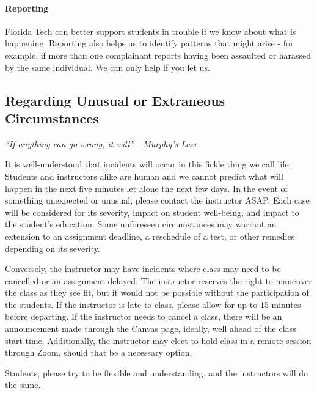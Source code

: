     \paragraph*{Reporting} Florida Tech can better support students in trouble if we know about what is happening.  Reporting also helps us to identify patterns that might arise - for example, if more than one complainant reports having been assaulted or harassed by the same individual. We can only help if you let us.

    \subsection*{Regarding Unusual or Extraneous Circumstances}
    \emph{``If anything can go wrong, it will'' - Murphy's Law}

    It is well-understood that incidents will occur in this fickle thing we call life.
    Students and instructors alike are human and we cannot predict what will happen in the next five minutes let alone the next few days.
    In the event of something unexpected or unusual, please contact the instructor ASAP.
    Each case will be considered for its severity, impact on student well-being, and impact to the student's education.
    Some unforeseen circumstances may warrant an extension to an assignment deadline, a reschedule of a test, or other remedies depending on its severity.
    
    Conversely, the instructor may have incidents where class may need to be cancelled or an assignment delayed. The instructor reserves the right to maneuver the class as they see fit, but it would not be possible without the participation of the students.
    If the instructor is late to class, please allow for up to 15 minutes before departing.
    If the instructor needs to cancel a class, there will be an announcement made through the Canvas page, ideally, well ahead of the class start time.
    Additionally, the instructor may elect to hold class in a remote session through Zoom, should that be a necessary option.
    
    Students, please try to be flexible and understanding, and the instructors will do the same.

